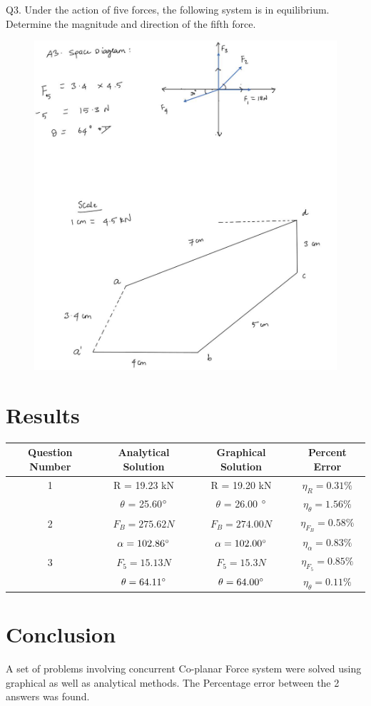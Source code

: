 \documentclass[11pt]{article}
\begin{document}
\pagebreak

Q3. Under the action of five forces, the following system is in equilibrium. Determine the magnitude and direction of the fifth force. 

\begin{figure}[H]
	\includegraphics[scale=0.45]{g3.jpg}
	\label{fig: Polygon Law}
\end{figure}

\pagebreak

\section{Results}

\begin{tabular}{|c|c|c|c|}
	\hline
	Question Number & Analytical Solution & Graphical Solution & Percent Error \\
	\hline
	1 	& R = 19.23 kN  & R = 19.20 kN & $\eta_R = 0.31\%$\\
		& $\theta$ = 25.60$\degree$ & $\theta$ = 26.00 $\degree$ & $\eta_\theta = 1.56 \%$\\
	\hline
	2	& $ F_B = 275.62 N $ & $ F_B = 274.00 N $ & $\eta_{F_B} = 0.58\%$ \\
		& $ \alpha = 102.86\degree $ & $ \alpha = 102.00\degree $ & $\eta_\alpha = 0.83\%$ \\
	\hline
	3	& $ F_5 = 15.13 N $ & $ F_5 = 15.3 N $ & $\eta_{F_5} = 0.85\%$ \\
		& $ \theta = 64.11\degree $ & $ \theta = 64.00\degree $ & $\eta_\theta = 0.11\%$ \\
	\hline
\end{tabular}


\section{Conclusion}
A set of problems involving concurrent Co-planar Force system were solved using graphical as well as analytical methods. The Percentage error between the 2 answers was found.
\end{document}
